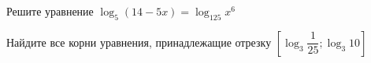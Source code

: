 \begin{ex}
	\begin{condition}
		\begin{enumcols}[label=\asbuk*)]
			\item Решите уравнение \( \log_5 (14-5x) = \log_{125} x^6  \)
			\item Найдите все корни уравнения, принадлежащие отрезку \( \left[\log_3 \dfrac{1}{25};\log_3 10\right] \)
		\end{enumcols}
	\end{condition}
\end{ex}